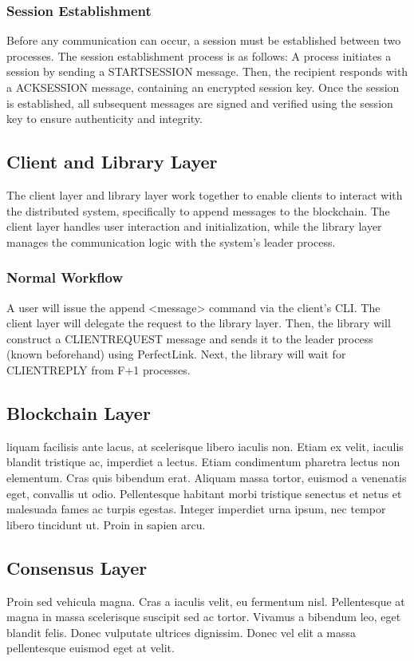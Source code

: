 \documentclass[runningheads]{llncs}
\begin{document}
\subsubsection{Session Establishment}

Before any communication can occur, a session must be established between two
processes. The session establishment process is as follows: A process initiates
a session by sending a STARTSESSION message. Then, the recipient responds with a
ACKSESSION message, containing an encrypted session key. Once the session is
established, all subsequent messages are signed and verified using the session
key to ensure authenticity and integrity.
%
\subsection{Client and Library Layer}
The client layer and library layer work together to enable clients to interact
with the distributed system, specifically to append messages to the blockchain.
The client layer handles user interaction and initialization, while the library
layer manages the communication logic with the system's leader process.
\subsubsection{Normal Workflow}
A user will issue the append <message> command via the client's CLI. The client
layer will delegate the request to the library layer. Then, the library will
construct a CLIENTREQUEST message and sends it to the leader process (known
beforehand) using PerfectLink. Next, the library will wait for CLIENTREPLY from
F+1 processes.

%
\subsection{Blockchain Layer}
liquam facilisis ante lacus, at scelerisque libero iaculis non. Etiam ex velit,
iaculis blandit tristique ac, imperdiet a lectus. Etiam condimentum pharetra
lectus non elementum. Cras quis bibendum erat. Aliquam massa tortor, euismod a
venenatis eget, convallis ut odio. Pellentesque habitant morbi tristique
senectus et netus et malesuada fames ac turpis egestas. Integer imperdiet urna
ipsum, nec tempor libero tincidunt ut. Proin in sapien arcu.
%
\subsection{Consensus Layer}
Proin sed vehicula magna. Cras a iaculis velit, eu fermentum nisl. Pellentesque
at magna in massa scelerisque suscipit sed ac tortor. Vivamus a bibendum leo,
eget blandit felis. Donec vulputate ultrices dignissim. Donec vel elit a massa
pellentesque euismod eget at velit.
%
\end{document}
